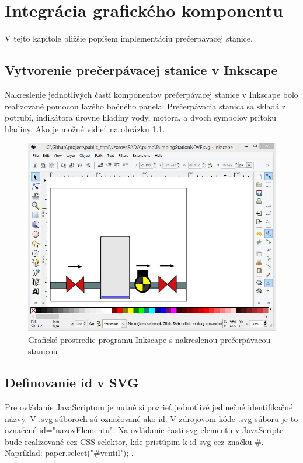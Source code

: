 \chapter{Integrácia grafického komponentu}

V tejto kapitole bližšie popíšem implementáciu prečerpávacej stanice. 

\section{Vytvorenie prečerpávacej stanice v Inkscape}

Nakreslenie jednotlivých častí komponentov prečerpávacej stanice v Inkscape bolo realizované pomocou ľavého bočného panela. Prečerpávacia stanica sa skladá z potrubí, indikátora úrovne hladiny vody, motora, a dvoch symbolov prítoku hladiny. Ako je možné vidieť na obrázku  \ref{picture1}.  


\begin{figure}[H]
	\begin{center}
		\includegraphics[width=0.8\linewidth] {obrazky/pump1.jpg}
		\caption{Grafické prostredie programu Inkscape s nakreslenou prečerpávacou stanicou}
		\label{picture1}
	\end{center}
\end{figure}


\section{Definovanie id v SVG}

Pre ovládanie JavaScriptom je nutné si pozrieť jednotlivé jedinečné identifikačné názvy. V .svg súboroch sú označované ako id. V zdrojovom kóde .svg súboru je to označené id="nazovElementu". Na ovládanie časti svg elementu v JavaScripte bude realizované cez CSS selektor, kde pristúpim k id svg cez značku \#.  Napríklad: paper.select("\#ventil"); .


